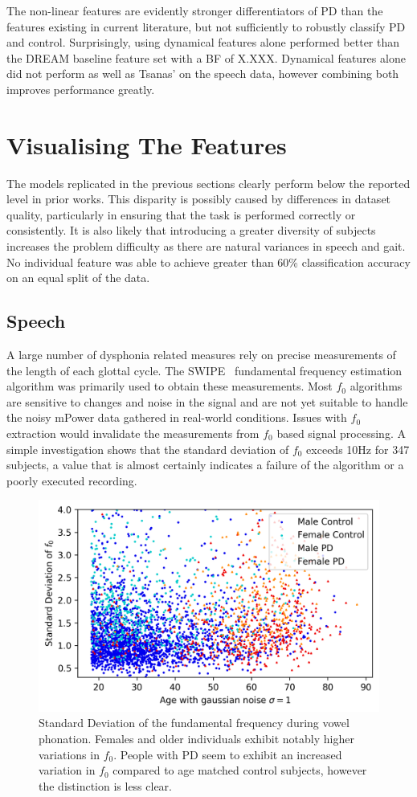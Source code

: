 \documentclass[12pt, twoside]{book}
\begin{document}
The non-linear features are evidently stronger differentiators of PD than the features existing in current literature, but not sufficiently to robustly classify PD and control. Surprisingly, using dynamical features alone performed better than the DREAM baseline feature set with a BF of X.XXX. Dynamical features alone did not perform as well as Tsanas' on the speech data, however combining both improves performance greatly.

\section{Visualising The Features}
The models replicated in the previous sections clearly perform below the reported level in prior works. This disparity is possibly caused by differences in dataset quality, particularly in ensuring that the task is performed correctly or consistently. It is also likely that introducing a greater diversity of subjects increases the problem difficulty as there are natural variances in speech and gait. No individual feature was able to achieve greater than 60\% classification accuracy on an equal split of the data. 

\subsection{Speech}
A large number of dysphonia related measures rely on precise measurements of the length of each glottal cycle. The SWIPE~\cite{camacho2007swipe} fundamental frequency estimation algorithm was primarily used to obtain these measurements. Most $f_0$ algorithms are sensitive to changes and noise in the signal and are not yet suitable to handle the noisy mPower data gathered in real-world conditions. Issues with $f_0$ extraction would invalidate the measurements from $f_0$ based signal processing. A simple investigation shows that the standard deviation of $f_0$ exceeds 10Hz for 347 subjects, a value that is almost certainly indicates a failure of the algorithm or a poorly executed recording.

\begin{figure}[h]
	\caption{Standard Deviation of the fundamental frequency during vowel phonation. Females and older individuals exhibit notably higher variations in $f_0$. People with PD seem to exhibit an increased variation in $f_0$ compared to age matched control subjects, however the distinction is less clear.}
	\label{stdevf0}
	\centering\includegraphics[width=0.75\linewidth]{f0stdev.png}
\end{figure}
\end{document}

